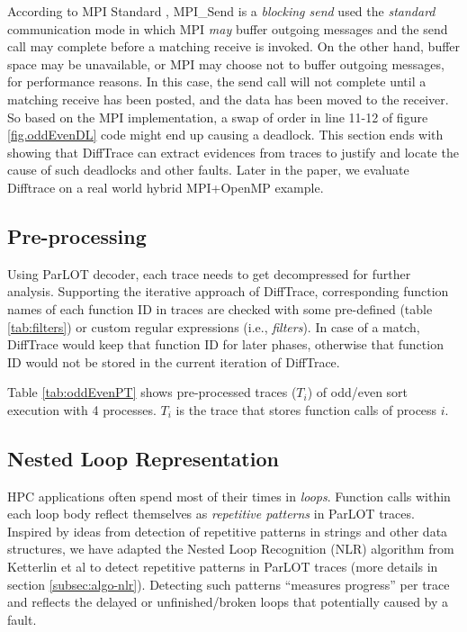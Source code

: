 According to MPI Standard , MPI\_Send is a \textit{blocking send} used the \textit{standard} communication mode in which MPI \textit{may} buffer outgoing messages and the send call may complete before a matching receive is invoked. On the other hand, buffer space may be unavailable, or MPI may choose not to buffer outgoing messages, for performance reasons. In this case, the send call will not complete until a matching receive has been posted, and the data has been moved to the receiver. So based on the MPI implementation, a swap of order in line 11-12 of figure \ref{fig.oddEvenDL} code might end up causing a deadlock. This section ends with showing that DiffTrace can extract evidences from traces to justify and locate the cause of such deadlocks and other faults. Later in the paper, we evaluate Difftrace on a real world hybrid MPI+OpenMP example.

\subsection{Pre-processing}

Using ParLOT decoder, each trace needs to get decompressed for further analysis.
Supporting the iterative approach of DiffTrace, corresponding function names of each function ID in traces are checked with some pre-defined (table \ref{tab:filters}) or custom regular expressions (i.e., \textit{filters}). In case of a match, DiffTrace would keep that function ID for later phases, otherwise that function ID would not be stored in the current iteration of DiffTrace.

Table \ref{tab:oddEvenPT} shows pre-processed traces ($T_i$) of odd/even sort execution with 4 processes. $T_i$ is the trace that stores function calls of process $i$.



\subsection{Nested Loop Representation}
HPC applications often spend most of their times in \textit{loops}. Function calls within each loop body reflect themselves as \textit{repetitive patterns} in ParLOT traces. Inspired by ideas from detection of repetitive patterns in strings \cite{nakamura_fast_2013} and other data structures\cite{kmr}, we have adapted the Nested Loop Recognition (NLR) algorithm from Ketterlin et al\cite{Ketterlin-nlr} to detect repetitive patterns in ParLOT traces (more details in section \ref{subsec:algo-nlr}). Detecting such patterns ``measures progress'' per trace and reflects the delayed or unfinished/broken loops that potentially caused by a fault.


